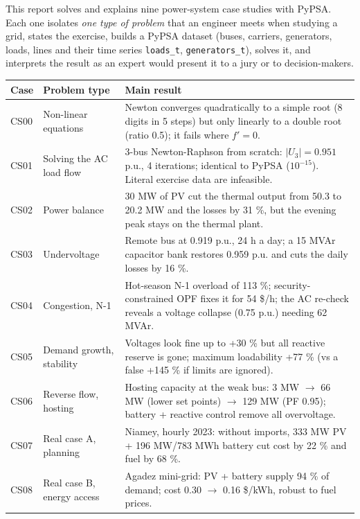 \documentclass[11pt,a4paper]{article}
\begin{document}
This report solves and explains nine power-system case studies with PyPSA. Each one isolates
\emph{one type of problem} that an engineer meets when studying a grid, states the exercise,
builds a PyPSA dataset (buses, carriers, generators, loads, lines and their time series
\texttt{loads\_t}, \texttt{generators\_t}), solves it, and interprets the result as an expert
would present it to a jury or to decision-makers.

\begin{center}\small
\begin{tabularx}{\textwidth}{@{}l>{\raggedright}p{3.0cm}X@{}}
\toprule
Case & Problem type & Main result \\
\midrule
CS00 & Non-linear equations & Newton converges quadratically to a simple root (8 digits in 5 steps) but only linearly to a double root (ratio 0.5); it fails where $f'=0$. \\
CS01 & Solving the AC load flow & 3-bus Newton-Raphson from scratch: $|U_3| = 0.951$ p.u., 4 iterations; identical to PyPSA ($10^{-15}$). Literal exercise data are infeasible. \\
CS02 & Power balance & 30 MW of PV cut the thermal output from 50.3 to 20.2 MW and the losses by 31 \%, but the evening peak stays on the thermal plant. \\
CS03 & Undervoltage & Remote bus at 0.919 p.u., 24 h a day; a 15 MVAr capacitor bank restores 0.959 p.u. and cuts the daily losses by 16 \%. \\
CS04 & Congestion, N-1 & Hot-season N-1 overload of 113 \%; security-constrained OPF fixes it for 54 \$/h; the AC re-check reveals a voltage collapse (0.75 p.u.) needing 62 MVAr. \\
CS05 & Demand growth, stability & Voltages look fine up to +30 \% but all reactive reserve is gone; maximum loadability +77 \% (vs a false +145 \% if limits are ignored). \\
CS06 & Reverse flow, hosting & Hosting capacity at the weak bus: 3 MW $\rightarrow$ 66 MW (lower set points) $\rightarrow$ 129 MW (PF 0.95); battery + reactive control remove all overvoltage. \\
CS07 & Real case A, planning & Niamey, hourly 2023: without imports, 333 MW PV + 196 MW/783 MWh battery cut cost by 22 \% and fuel by 68 \%. \\
CS08 & Real case B, energy access & Agadez mini-grid: PV + battery supply 94 \% of demand; cost 0.30 $\rightarrow$ 0.16 \$/kWh, robust to fuel prices. \\
\bottomrule
\end{tabularx}
\end{center}
\end{document}
